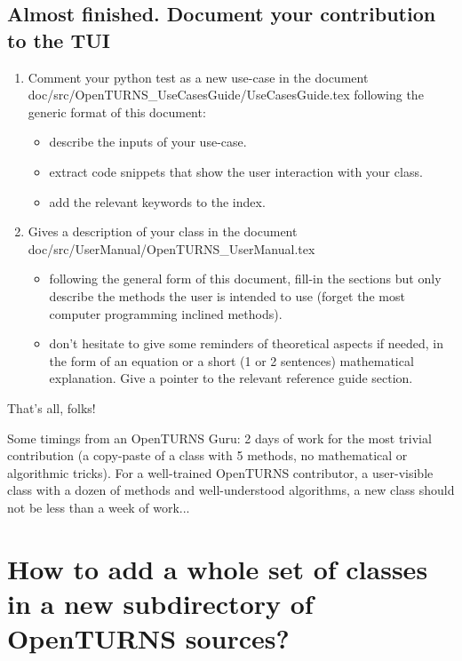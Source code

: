 \documentclass[11pt]{article}
\begin{document}
\subsection{Almost finished. Document your contribution to the TUI}

\begin{enumerate}
  \setcounter{enumi}{\value{enumi}}
\item Comment your python test as a new use-case in the document\\ doc/src/OpenTURNS\_UseCasesGuide/UseCasesGuide.tex following the generic format of this document:
  \begin{itemize}
  \item describe the inputs of your use-case.
  \item extract code snippets that show the user interaction with your class.
  \item add the relevant keywords to the index.
  \end{itemize}
\item Gives a description of your class in the document doc/src/UserManual/OpenTURNS\_UserManual.tex
  \begin{itemize}
  \item following the general form of this document, fill-in the sections but only describe the methods the user is intended to use (forget the most computer programming inclined methods).
  \item don't hesitate to give some reminders of theoretical aspects if needed, in the form of an equation or a short (1 or 2 sentences) mathematical explanation. Give a pointer to the relevant reference guide section.
  \end{itemize}
\end{enumerate}

That's all, folks!

Some timings from an OpenTURNS Guru: 2 days of work for the most trivial contribution (a copy-paste of a class with 5 methods, no mathematical or algorithmic tricks).
For a well-trained OpenTURNS contributor, a user-visible class with a dozen of methods and well-understood algorithms, a new class should not be less than a week of work...

\section{How to add a whole set of classes in a new subdirectory of OpenTURNS sources?\label{WholeDirectory}}
\end{document}
